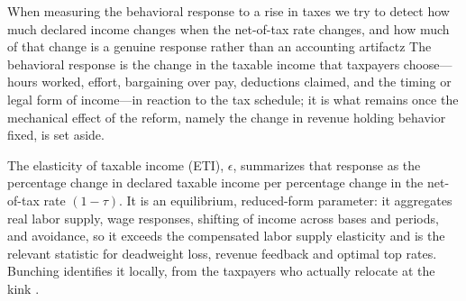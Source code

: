 When measuring the behavioral response to a rise in taxes we try to detect how much declared income changes when the net-of-tax rate changes, and how much of that change is a genuine response rather than an accounting artifactz The behavioral response is the change in the taxable income that taxpayers choose---hours worked, effort, bargaining over pay, deductions claimed, and the timing or legal form of income---in reaction to the tax schedule; it is what remains once the mechanical effect of the reform, namely the change in revenue holding behavior fixed, is set aside.

The elasticity of taxable income (ETI), $\epsilon$, summarizes that response as the percentage change in declared taxable income per percentage change in the net-of-tax rate $(1-\tau)$. It is an equilibrium, reduced-form parameter: it aggregates real labor supply, wage responses, shifting of income across bases and periods, and avoidance, so it exceeds the compensated labor supply elasticity and is the relevant statistic for deadweight loss, revenue feedback and optimal top rates. Bunching identifies it locally, from the taxpayers who actually relocate at the kink \parencite{chetty2011adjustment}.

